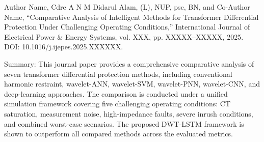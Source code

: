 \cite{ref3} Author Name, Cdre A N M Didarul Alam, (L), NUP, psc, BN, and Co-Author Name, ``Comparative Analysis of Intelligent Methods for Transformer Differential Protection Under Challenging Operating Conditions,'' International Journal of Electrical Power \& Energy Systems, vol. XXX, pp. XXXXX--XXXXX, 2025. DOI: 10.1016/j.ijepes.2025.XXXXXX.

Summary: This journal paper provides a comprehensive comparative analysis of seven transformer differential protection methods, including conventional harmonic restraint, wavelet-ANN, wavelet-SVM, wavelet-PNN, wavelet-CNN, and deep-learning approaches. The comparison is conducted under a unified simulation framework covering five challenging operating conditions: CT saturation, measurement noise, high-impedance faults, severe inrush conditions, and combined worst-case scenarios. The proposed DWT-LSTM framework is shown to outperform all compared methods across the evaluated metrics.

